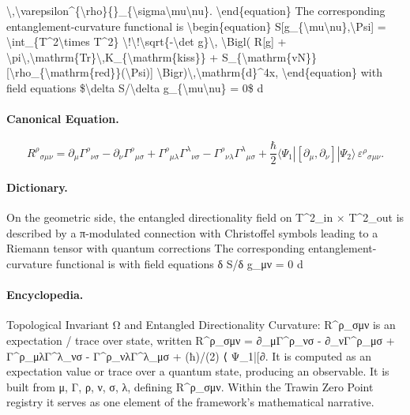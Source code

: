 \textbackslash{},\textbackslash{}varepsilon\textasciicircum{}\{\textbackslash{}rho\}\{\}\_\{\textbackslash{}sigma\textbackslash{}mu\textbackslash{}nu\}. \textbackslash{}end\{equation\} The corresponding entanglement-curvature functional is \textbackslash{}begin\{equation\} S[g\_\{\textbackslash{}mu\textbackslash{}nu\},\textbackslash{}Psi] = \textbackslash{}int\_\{T\textasciicircum{}2\textbackslash{}times T\textasciicircum{}2\} \textbackslash{}!\textbackslash{}!\textbackslash{}sqrt\{-\textbackslash{}det g\}\textbackslash{}, \textbackslash{}Bigl( R[g] + \textbackslash{}pi\textbackslash{},\textbackslash{}mathrm\{Tr\}\textbackslash{},K\_\{\textbackslash{}mathrm\{kiss\}\} + S\_\{\textbackslash{}mathrm\{vN\}\}[\textbackslash{}rho\_\{\textbackslash{}mathrm\{red\}\}(\textbackslash{}Psi)] \textbackslash{}Bigr)\textbackslash{},\textbackslash{}mathrm\{d\}\textasciicircum{}4x, \textbackslash{}end\{equation\} with field equations \$\textbackslash{}delta S/\textbackslash{}delta g\_\{\textbackslash{}mu\textbackslash{}nu\} = 0\$ d

\paragraph{Canonical Equation.}
\[
R^{\rho}{}_{\sigma\mu\nu} = \partial_{\mu}\Gamma^{\rho}{}_{\nu\sigma} - \partial_{\nu}\Gamma^{\rho}{}_{\mu\sigma} + \Gamma^{\rho}{}_{\mu\lambda}\Gamma^{\lambda}{}_{\nu\sigma} - \Gamma^{\rho}{}_{\nu\lambda}\Gamma^{\lambda}{}_{\mu\sigma} + \frac{\hbar}{2} \langle \Psi_1|[\partial_{\mu},\partial_{\nu}]|\Psi_2\rangle \,\varepsilon^{\rho}{}_{\sigma\mu\nu}.
\]

\paragraph{Dictionary.}
On the geometric side, the entangled directionality field on T\textasciicircum{}2\_in × T\textasciicircum{}2\_out is described by a π-modulated connection with Christoffel symbols leading to a Riemann tensor with quantum corrections The corresponding entanglement-curvature functional is with field equations δ S/δ g\_μν = 0 d

\paragraph{Encyclopedia.}
Topological Invariant Ω and Entangled Directionality Curvature: R\textasciicircum{}ρ\_σμν is an expectation / trace over state, written R\textasciicircum{}ρ\_σμν = ∂\_μΓ\textasciicircum{}ρ\_νσ - ∂\_νΓ\textasciicircum{}ρ\_μσ + Γ\textasciicircum{}ρ\_μλΓ\textasciicircum{}λ\_νσ - Γ\textasciicircum{}ρ\_νλΓ\textasciicircum{}λ\_μσ + (ħ)/(2) ⟨ Ψ\_1|[∂. It is computed as an expectation value or trace over a quantum state, producing an observable. It is built from μ, Γ, ρ, ν, σ, λ, defining R\textasciicircum{}ρ\_σμν. Within the Trawin Zero Point registry it serves as one element of the framework's mathematical narrative.
